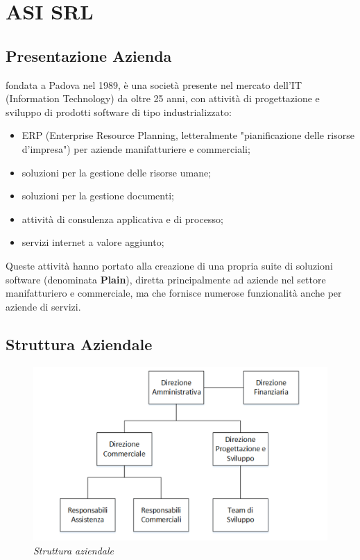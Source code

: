 
\newpage
\chapter{ASI SRL}
\label{cap:introduzione}
\section{Presentazione Azienda}
\asi fondata a Padova nel 1989, è una società presente nel mercato dell'IT (Information Technology) da oltre 25 anni, con attività di progettazione e sviluppo di prodotti software di tipo industrializzato:
\begin{itemize}
	\item ERP (Enterprise Resource Planning, letteralmente "pianificazione delle risorse d'impresa") per aziende manifatturiere e commerciali;
	\item soluzioni per la gestione delle risorse umane;
	\item soluzioni per la gestione documenti;
	\item attività di consulenza applicativa e di processo;
	\item servizi internet a valore aggiunto;	
\end{itemize}
Queste attività hanno portato alla creazione di una propria suite di soluzioni software (denominata \textbf{Plain}), diretta principalmente ad aziende nel settore manifatturiero e commerciale, ma che fornisce numerose funzionalità anche per aziende di servizi.
\section{Struttura Aziendale}

\begin{figure}[ht]
	\centering
	\includegraphics[scale=0.20]{immagini/azienda/struttura_aziendale}
	\caption{\textit{Struttura aziendale \asi}}
\end{figure}\FloatBarrier

